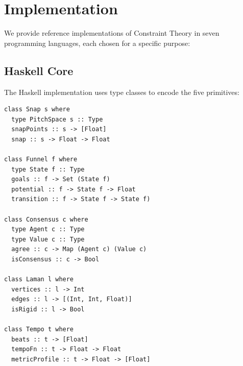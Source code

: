\documentclass[cmj]{article}
\begin{document}
\section{Implementation}
\label{sec:implementation}

We provide reference implementations of Constraint Theory in seven programming
languages, each chosen for a specific purpose:


\subsection{Haskell Core}

The Haskell implementation uses type classes to encode the five primitives:

\begin{lstlisting}[style=haskell,caption={Haskell type classes for the five primitives}]
class Snap s where
  type PitchSpace s :: Type
  snapPoints :: s -> [Float]
  snap :: s -> Float -> Float

class Funnel f where
  type State f :: Type
  goals :: f -> Set (State f)
  potential :: f -> State f -> Float
  transition :: f -> State f -> State f)

class Consensus c where
  type Agent c :: Type
  type Value c :: Type
  agree :: c -> Map (Agent c) (Value c)
  isConsensus :: c -> Bool

class Laman l where
  vertices :: l -> Int
  edges :: l -> [(Int, Int, Float)]
  isRigid :: l -> Bool

class Tempo t where
  beats :: t -> [Float]
  tempoFn :: t -> Float -> Float
  metricProfile :: t -> Float -> [Float]
\end{lstlisting}
\end{document}
